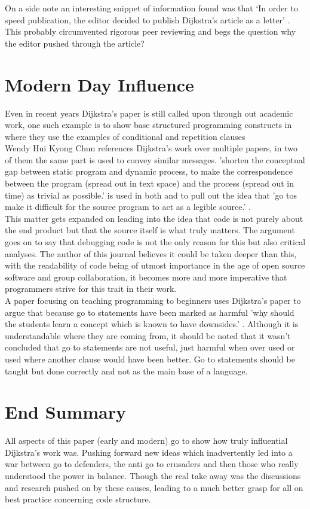 \documentclass{scrartcl}
\begin{document}
On a side note an interesting snippet of information found was that `In order to speed publication, the editor decided to publish Dijkstra's article as a letter' \cite[p.265]{knuth1974structured}. This probably circumvented rigorous peer reviewing and begs the question why the editor pushed through the article?\\

\section{Modern Day Influence}
Even in recent years Dijkstra's paper is still called upon through out academic work, one such example is to show base structured programming constructs in \cite{neil2000building} where they use the examples of conditional and repetition clauses\\
Wendy Hui Kyong Chun references Dijkstra's work over multiple papers, in two of them the same part is used to convey similar messages. 'shorten the conceptual gap between static program and dynamic process, to make the correspondence between the program (spread out in text space) and the process (spread out in time) as trivial as possible.' \cite[p.137]{dijkstra2002go} is used in both \cite{chun2005software} and \cite{chun2008sourcery} to pull out the idea that 'go tos make it difficult for the source program to act as a legible source.' \cite[p.303]{chun2008sourcery}.\\ 
This matter gets expanded on leading into the idea that code is not purely about the end product but that the source itself is what truly matters. The argument goes on to say that debugging code is not the only reason for this but also critical analyses. The author of this journal believes it could be taken deeper than this, with the readability of code being of utmost importance in the age of open source software and group collaboration, it becomes more and more imperative that programmers strive for this trait in their work.\\
A paper \cite{huch2007learning} focusing on teaching programming to beginners uses Dijkstra's paper to argue that because go to statements have been marked as harmful 'why should the students learn a concept which is known to have downsides.' \cite[p.94]{huch2007learning}. Although it is understandable where they are coming from, it should be noted that it wasn't concluded that go to statements are not useful, just harmful when over used or used where another clause would have been better. Go to statements should be taught but done correctly and not as the main base of a language.
\section{End Summary}
All aspects of this paper (early and modern) go to show how truly influential Dijkstra's work was. Pushing forward new ideas which inadvertently led into a war between go to defenders, the anti go to crusaders and then those who really understood the power in balance. Though the real take away was the discussions and research pushed on by these causes, leading to a much better grasp for all on best practice concerning code structure.




\end{document}
